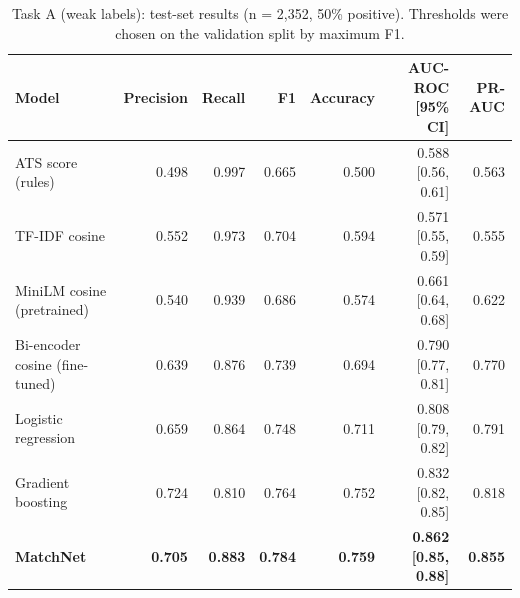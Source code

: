 \begin{table}[H]
\centering\small
\begin{tabularx}{\linewidth}{@{}l r r r r r r@{}}
\toprule
Model & Precision & Recall & F1 & Accuracy & AUC-ROC [95\% CI] & PR-AUC\\
\midrule
ATS score (rules) & 0.498 & 0.997 & 0.665 & 0.500 & 0.588 [0.56, 0.61] & 0.563\\
TF-IDF cosine & 0.552 & 0.973 & 0.704 & 0.594 & 0.571 [0.55, 0.59] & 0.555\\
MiniLM cosine (pretrained) & 0.540 & 0.939 & 0.686 & 0.574 & 0.661 [0.64, 0.68] & 0.622\\
Bi-encoder cosine (fine-tuned) & 0.639 & 0.876 & 0.739 & 0.694 & 0.790 [0.77, 0.81] & 0.770\\
Logistic regression & 0.659 & 0.864 & 0.748 & 0.711 & 0.808 [0.79, 0.82] & 0.791\\
Gradient boosting & 0.724 & 0.810 & 0.764 & 0.752 & 0.832 [0.82, 0.85] & 0.818\\
\textbf{MatchNet} & \textbf{0.705} & \textbf{0.883} & \textbf{0.784} & \textbf{0.759} & \textbf{0.862 [0.85, 0.88]} & \textbf{0.855}\\
\bottomrule
\end{tabularx}
\caption{Task A (weak labels): test-set results (n = 2,352, 50\% positive). Thresholds were chosen on the validation split by maximum F1.}\label{tab:resweak}
\end{table}
